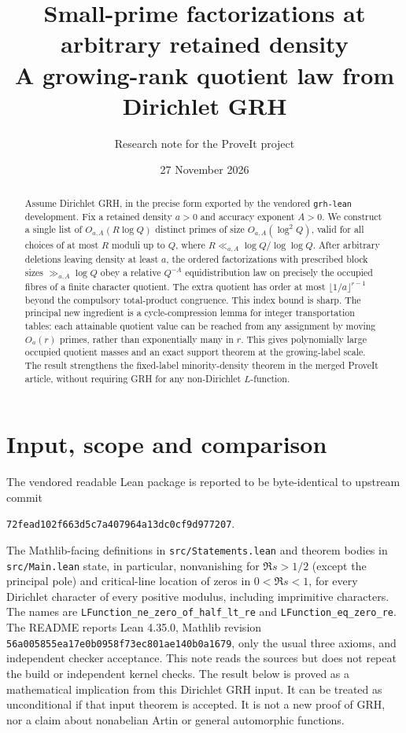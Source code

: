 \documentclass[11pt]{article}
\title{Small-prime factorizations at arbitrary retained density\\\large A growing-rank quotient law from Dirichlet GRH}
\author{Research note for the ProveIt project}
\date{27 November 2026}
\theoremstyle{remark}\newtheorem{remark}[theorem]{Remark}
\begin{document}
\maketitle
\begin{abstract}
Assume Dirichlet GRH, in the precise form exported by the vendored \texttt{grh-lean} development. Fix a retained density $a>0$ and accuracy exponent $A>0$. We construct a single list of $O_{a,A}(R\log Q)$ distinct primes of size $O_{a,A}(\log^2 Q)$, valid for all choices of at most $R$ moduli up to $Q$, where $R\ll_{a,A}\log Q/\log\log Q$. After arbitrary deletions leaving density at least $a$, the ordered factorizations with prescribed block sizes $\gg_{a,A}\log Q$ obey a relative $Q^{-A}$ equidistribution law on precisely the occupied fibres of a finite character quotient. The extra quotient has order at most $\lfloor1/a\rfloor^{r-1}$ beyond the compulsory total-product congruence. This index bound is sharp. The principal new ingredient is a cycle-compression lemma for integer transportation tables: each attainable quotient value can be reached from any assignment by moving $O_a(r)$ primes, rather than exponentially many in $r$. This gives polynomially large occupied quotient masses and an exact support theorem at the growing-label scale. The result strengthens the fixed-label minority-density theorem in the merged ProveIt article, without requiring GRH for any non-Dirichlet $L$-function.
\end{abstract}
\section{Input, scope and comparison}
The vendored readable Lean package \cite{vendor,statements,main} is reported to be byte-identical to upstream commit
\begin{center}\small\texttt{72fead102f663d5c7a407964a13dc0cf9d977207}.\end{center}
The Mathlib-facing definitions in \texttt{src/Statements.lean} and theorem bodies in \texttt{src/Main.lean} state, in particular, nonvanishing for $\Re s>1/2$ (except the principal pole) and critical-line location of zeros in $0<\Re s<1$, for every Dirichlet character of every positive modulus, including imprimitive characters. The names are \texttt{LFunction\_ne\_zero\_of\_half\_lt\_re} and \texttt{LFunction\_eq\_zero\_re}. The README reports Lean 4.35.0, Mathlib revision \texttt{56a005855ea17e0b0958f73ec801ae140b0a1679}, only the usual three axioms, and independent checker acceptance. This note reads the sources but does not repeat the build or independent kernel checks. The result below is proved as a mathematical implication from this Dirichlet GRH input. It can be treated as unconditional if that input theorem is accepted. It is not a new proof of GRH, nor a claim about nonabelian Artin or general automorphic functions.
\end{document}
